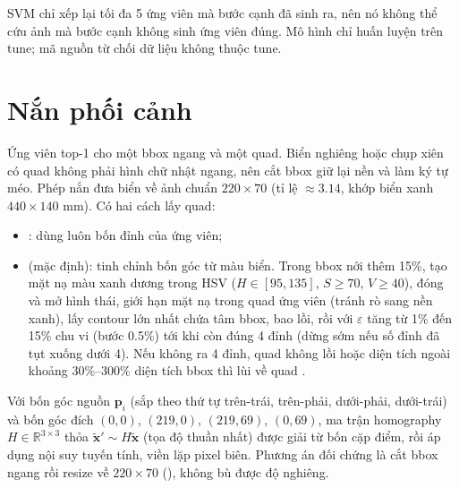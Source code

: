 SVM chỉ xếp lại tối đa 5 ứng viên mà bước cạnh đã sinh ra, nên nó không thể cứu ảnh mà bước cạnh không sinh ứng viên đúng. Mô hình chỉ huấn luyện trên tune; mã nguồn từ chối dữ liệu không thuộc tune.

\section{Nắn phối cảnh}
\label{sec:rectify}

Ứng viên top-1 cho một bbox ngang và một quad. Biển nghiêng hoặc chụp xiên có quad không phải hình chữ nhật ngang, nên cắt bbox giữ lại nền và làm ký tự méo. Phép nắn đưa biển về ảnh chuẩn $220\times 70$ (tỉ lệ $\approx 3.14$, khớp biển xanh $440\times 140$ mm). Có hai cách lấy quad:
\begin{itemize}
  \item {}: dùng luôn bốn đỉnh  của ứng viên;
  \item {} (mặc định): tinh chỉnh bốn góc từ màu biển. Trong bbox nới thêm 15\%, tạo mặt nạ màu xanh dương trong HSV ($H\in[95,135]$, $S\ge 70$, $V\ge 40$), đóng và mở hình thái, giới hạn mặt nạ trong quad ứng viên (tránh rò sang nền xanh), lấy contour lớn nhất chứa tâm bbox, bao lồi, rồi  với $\varepsilon$ tăng từ 1\% đến 15\% chu vi (bước 0.5\%) tới khi còn đúng 4 đỉnh (dừng sớm nếu số đỉnh đã tụt xuống dưới 4). Nếu không ra 4 đỉnh, quad không lồi hoặc diện tích ngoài khoảng $30\%$--$300\%$ diện tích bbox thì lùi về quad .
\end{itemize}
Với bốn góc nguồn $\mathbf{p}_i$ (sắp theo thứ tự trên-trái, trên-phải, dưới-phải, dưới-trái) và bốn góc đích $(0,0)$, $(219,0)$, $(219,69)$, $(0,69)$, ma trận homography $H\in\mathbb{R}^{3\times 3}$ thỏa $\tilde{\mathbf{x}}'\sim H\tilde{\mathbf{x}}$ (tọa độ thuần nhất) được giải từ bốn cặp điểm, rồi áp dụng nội suy tuyến tính, viền lặp pixel biên. Phương án đối chứng là cắt bbox ngang rồi resize về $220\times 70$ (), không bù được độ nghiêng.

